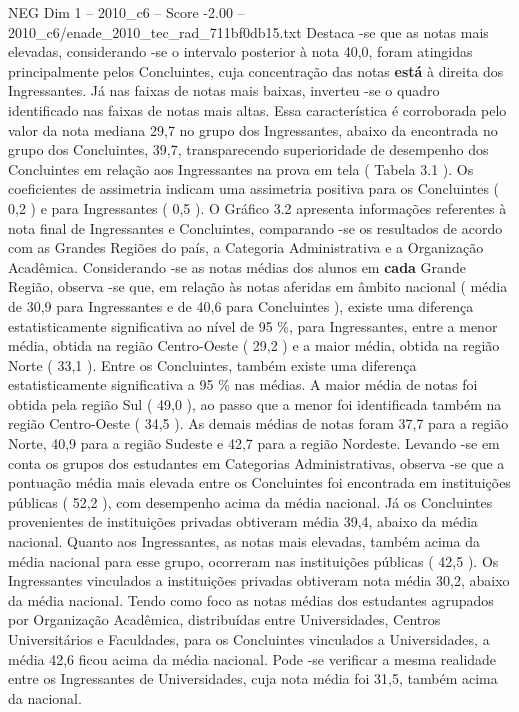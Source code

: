 \begin{textsample}{NEG Dim 1 – 2010\_c6 – Score -2.00 – 2010\_c6/enade\_2010\_tec\_rad\_711bf0db15.txt}
Destaca -se que as notas mais elevadas, considerando -se o intervalo posterior à nota 40,0, foram atingidas principalmente pelos Concluintes, cuja concentração das notas \textbf{está} à direita dos Ingressantes.
Já nas faixas de notas mais baixas, inverteu -se o quadro identificado nas faixas de notas mais altas.
Essa característica é corroborada pelo valor da nota mediana 29,7 no grupo dos Ingressantes, abaixo da encontrada no grupo dos Concluintes, 39,7, transparecendo superioridade de desempenho dos Concluintes em relação aos Ingressantes na prova em tela ( Tabela 3.1 ).
Os coeficientes de assimetria indicam uma assimetria positiva para os Concluintes ( 0,2 ) e para Ingressantes ( 0,5 ).
O Gráfico 3.2 apresenta informações referentes à nota final de Ingressantes e Concluintes, comparando -se os resultados de acordo com as Grandes Regiões do país, a Categoria Administrativa e a Organização Acadêmica.
Considerando -se as notas médias dos alunos em \textbf{cada} Grande Região, observa -se que, em relação às notas aferidas em âmbito nacional ( média de 30,9 para Ingressantes e de 40,6 para Concluintes ), existe uma diferença estatisticamente significativa ao nível de 95 \%, para Ingressantes, entre a menor média, obtida na região Centro-Oeste ( 29,2 ) e a maior média, obtida na região Norte ( 33,1 ).
Entre os Concluintes, também existe uma diferença estatisticamente significativa a 95 \% nas médias.
A maior média de notas foi obtida pela região Sul ( 49,0 ), ao passo que a menor foi identificada também na região Centro-Oeste ( 34,5 ).
As demais médias de notas foram 37,7 para a região Norte, 40,9 para a região Sudeste e 42,7 para a região Nordeste.
Levando -se em conta os grupos dos estudantes em Categorias Administrativas, observa -se que a pontuação média mais elevada entre os Concluintes foi encontrada em instituições públicas ( 52,2 ), com desempenho acima da média nacional.
Já os Concluintes provenientes de instituições privadas obtiveram média 39,4, abaixo da média nacional.
Quanto aos Ingressantes, as notas mais elevadas, também acima da média nacional para esse grupo, ocorreram nas instituições públicas ( 42,5 ).
Os Ingressantes vinculados a instituições privadas obtiveram nota média 30,2, abaixo da média nacional.
Tendo como foco as notas médias dos estudantes agrupados por Organização Acadêmica, distribuídas entre Universidades, Centros Universitários e Faculdades, para os Concluintes vinculados a Universidades, a média 42,6 ficou acima da média nacional.
Pode -se verificar a mesma realidade entre os Ingressantes de Universidades, cuja nota média foi 31,5, também acima da nacional.

\end{textsample}
